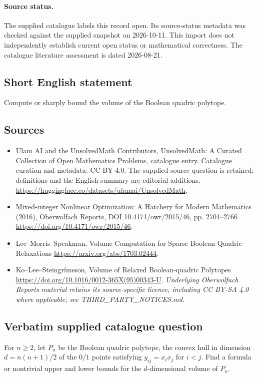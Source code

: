 \documentclass[11pt]{article}
\begin{document}
\paragraph{Source status.}
The supplied catalogue labels this record open. Its source-status metadata was checked against the supplied snapshot on 2026-10-11. This import does not independently establish current open status or mathematical correctness. The catalogue literature assessment is dated 2026-08-21.
\subsection{Short English statement}
Compute or sharply bound the volume of the Boolean quadric polytope.
\subsection{Sources}
\begin{itemize}
\item[S1] Ulam AI and the UnsolvedMath Contributors, UnsolvedMath: A Curated Collection of Open Mathematics Problems, catalogue entry. Catalogue curation and metadata: CC BY 4.0. The supplied source question is retained; definitions and the English summary are editorial additions.
\url{https://huggingface.co/datasets/ulamai/UnsolvedMath}.
\item[S2] Mixed-integer Nonlinear Optimization: A Hatchery for Modern Mathematics (2016), Oberwolfach Reports, DOI 10.4171/owr/2015/46, pp. 2701--2766
\url{https://doi.org/10.4171/owr/2015/46}.
\item[S3] Lee--Morris--Speakman, Volume Computation for Sparse Boolean Quadric Relaxations
\url{https://arxiv.org/abs/1703.02444}.
\item[S4] Ko--Lee--Steingrímsson, Volume of Relaxed Boolean-quadric Polytopes
\url{https://doi.org/10.1016/0012-365X(95)00343-U}.
\textit{Underlying Oberwolfach Reports material retains its source-specific licence, including CC BY-SA 4.0 where applicable; see THIRD\_PARTY\_NOTICES.md.}
\end{itemize}
\subsection{Verbatim supplied catalogue question}
For $n\geq2$, let $P_n$ be the Boolean quadric polytope, the convex hull in dimension $d=n(n+1)/2$ of the $0/1$ points satisfying $y_{ij}=x_ix_j$ for $i<j$. Find a formula or nontrivial upper and lower bounds for the $d$-dimensional volume of $P_n$.
\end{document}
